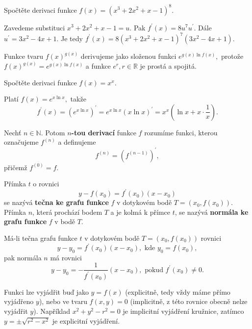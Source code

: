 \begin{priklad}
  Spočtěte derivaci funkce $f(x)=\left (x^3+2x^2+x-1\right )^8.$
\end{priklad}

\begin{reseni}
  Zavedeme substituci $x^3+2x^2+x-1=u$. Pak $f^\prime(x)=8u^7u^\prime$. Dále $u^\prime=3x^2-4x+1.$
  Je tedy $f^\prime(x)=8\left(x^3+2x^2+x-1\right)^7(3x^2-4x+1).$
\end{reseni}

\begin{pozn}
    Funkce tvaru $f(x)^{g(x)}$ derivujeme jako složenou funkci $e^{g(x)\ln f(x)},$
    protože $f(x)^{g(x)}=e^{g(x)\ln f(x)}$ a funkce $e^r, r \in \mathbb R$ je prostá
    a spojitá.
\end{pozn}

\begin{priklad}
  Spočtěte derivaci funkce $f(x)=x^x.$
\end{priklad}

\begin{reseni}
  Platí $f(x)=e^{x\ln x},$ takže $$f^\prime(x)=\left (e^{x\ln x}\right)^\prime=e^{x\ln x}(x\ln x)^\prime=
  x^x\left(\ln x+ x\cdot \frac{1}{x}\right).$$
\end{reseni}

\begin{definition}
Nechť $n \in \mathbb N$. Potom \textbf{$n$-tou derivací} funkce $f$ rozumíme funkci,
kterou označujeme $f^{(n)}$ a definujeme
$$f^{(n)}=\left ( f^{(n-1)} \right )^\prime, $$
přičemž $f^{(0)}=f.$
\end{definition}

\begin{definition}
Přímka $t$ o rovnici
$$y-f(x_0)=f^\prime(x_0)(x-x_0)$$
se nazývá \textbf{tečna ke grafu funkce} $f$ v dotykovém bodě $T=(x_0,f(x_0))$.
Přímka $n$, která prochází bodem $T$ a je kolmá k přímce $t$, se nazývá \textbf{normála
ke grafu funkce} $f$ v bodě $T.$
\end{definition}

\begin{veta}
    Má-li tečna grafu funkce $t$ v dotykovém bodě $T=(x_0, f(x_0))$ rovnici
    $$y-y_0=f^\prime(x_0)(x-x_0), \textrm{ kde } y_0=f(x_0),$$
    pak normála $n$ má rovnici
    $$y-y_0=-\frac{1}{f^\prime(x_0)}(x-x_0), \textrm{ pokud } f^\prime(x_0)\ne 0.$$
\end{veta}

\begin{pozn}
    Funkci lze vyjádřit buď jako $y=f(x)$ (explicitně, tedy vždy máme přímo vyjádřeno
    $y$), nebo ve tvaru $f(x,y)=0$ (implicitně, z této rovnice obecně nelze vyjádřit
    $y$). Například $x^2+y^2-r^2=0$ je implicitní vyjádření kružnice,
    zatímco $y=\pm \sqrt{r^2-x^2} $ je explicitní vyjádření.
\end{pozn}

